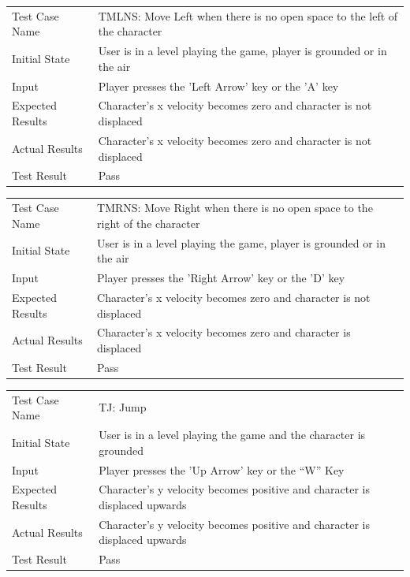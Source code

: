\documentclass[12pt, titlepage]{article}
\begin{document}
\begin{center}
\begin{tabular}{ | l | p{10cm} | }
\hline
Test Case Name & TMLNS: Move Left when there is no open space to the left of the character	\\
Initial State & User is in a level playing the game, player is grounded or in the air	\\
Input & Player presses the 'Left Arrow' key or the 'A' key	\\
Expected Results & Character's x velocity becomes zero and character is not displaced	\\
Actual Results & Character's x velocity becomes zero and character is not displaced	\\
Test Result & Pass	\\
\hline
\end{tabular}
\end{center}

\begin{center}
\begin{tabular}{ | l | p{10cm} | }
\hline
Test Case Name & TMRNS:  Move Right when there is no open space to the right of the character	\\
Initial State & User is in a level playing the game, player is grounded or in the air	\\
Input & Player presses the 'Right Arrow' key or the 'D' key	\\
Expected Results & Character's x velocity becomes zero and character is not displaced	\\
Actual Results & Character's x velocity becomes zero and character is displaced	\\
Test Result & Pass	\\
\hline
\end{tabular}
\end{center}

\begin{center}
\begin{tabular}{ | l | p{10cm} | }
\hline
Test Case Name & TJ: Jump	\\
Initial State & User is in a level playing the game and the character is grounded	\\
Input & Player presses the 'Up Arrow' key or the “W” Key	\\
Expected Results & Character's y velocity becomes positive and character is displaced upwards	\\
Actual Results & Character's y velocity becomes positive and character is displaced upwards	\\
Test Result & Pass	\\
\hline
\end{tabular}
\end{center}
\end{document}
